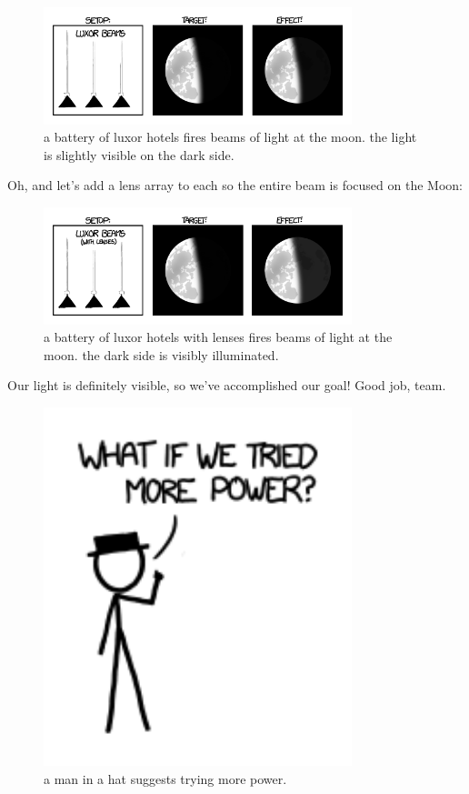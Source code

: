 \begin{figure}[!htbp]
\centering
\includegraphics[scale=0.5, max width=0.8\textwidth]{imgs/a/13/laser_pointer_luxor.png}
\caption{a battery of luxor hotels fires beams of light at the moon. the light is slightly visible on the dark side.}
\end{figure}

{Oh, and let’s add a lens array to each so the entire beam is focused on the Moon:}

\begin{figure}[!htbp]
\centering
\includegraphics[scale=0.5, max width=0.8\textwidth]{imgs/a/13/laser_pointer_luxor_lens.png}
\caption{a battery of luxor hotels with lenses fires beams of light at the moon. the dark side is visibly illuminated.}
\end{figure}

{Our light is definitely visible, so we’ve accomplished our goal! Good job, team.}

\begin{figure}[!htbp]
\centering
\includegraphics[scale=0.5, max width=0.8\textwidth]{imgs/a/13/laser_pointer_more_power.png}
\caption{a man in a hat suggests trying more power.}
\end{figure}

